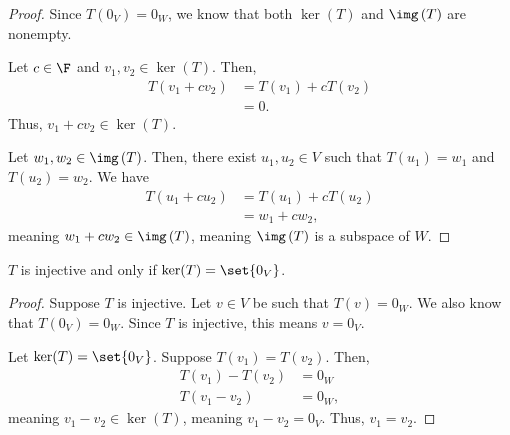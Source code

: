 \documentclass[10pt]{mypackage}
\begin{document}
\begin{proof}
  Since $T\left(0_V\right) = 0_W$, we know that both $\ker(T)$ and $\img\left(T\right)$ are nonempty.\newline

  Let $c\in \F$ and $v_1,v_2\in \ker(T)$. Then,
  \begin{align*}
    T\left(v_1 + cv_2\right) &= T\left(v_1\right) + cT\left(v_2\right)\\
                             &= 0.
  \end{align*}
  Thus, $v_1 + cv_2 \in \ker(T)$.\newline

  Let $w_1,w_2\in \img\left(T\right)$. Then, there exist $u_1,u_2\in V$ such that $T\left(u_1\right) = w_1$ and $T\left(u_2\right) = w_2$. We have
  \begin{align*}
    T\left(u_1 + cu_2\right) &= T\left(u_1\right) + cT\left(u_2\right)\\
                             &= w_1 + cw_2,
  \end{align*}
  meaning $w_1 + cw_2\in \img\left(T\right)$, meaning $\img\left(T\right)$ is a subspace of $W$.
\end{proof}
\begin{lemma}
  $T$ is injective and only if $\ker(T) = \set{0_V}$.
\end{lemma}
\begin{proof}
  Suppose $T$ is injective. Let $v\in V$ be such that $T\left(v\right) = 0_W$. We also know that $T\left(0_V\right) = 0_W$. Since $T$ is injective, this means $v = 0_V$.\newline

  Let $\ker(T) = \set{0_V}$. Suppose $T\left(v_1\right) = T\left(v_2\right)$. Then,
  \begin{align*}
    T\left(v_1\right) - T\left(v_2\right) &= 0_W\\
    T\left(v_1 - v_2\right) &= 0_W,
  \end{align*}
  meaning $v_1 - v_2 \in \ker(T)$, meaning $v_1 - v_2 = 0_V$. Thus, $v_1 = v_2$.
\end{proof}
\end{document}
